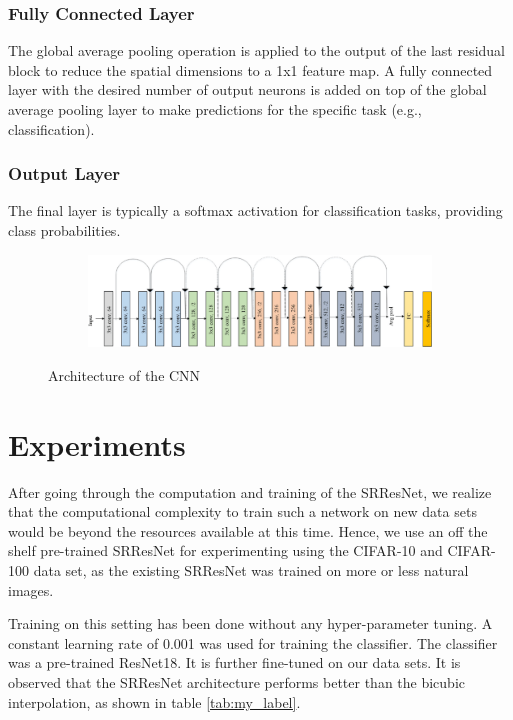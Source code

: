 \documentclass[10pt,twocolumn,letterpaper]{article}
\begin{document}
\subsubsection{Fully Connected Layer}
The global average pooling operation is applied to the output of the last residual block to reduce the spatial dimensions to a 1x1 feature map. A fully connected layer with the desired number of output neurons is added on top of the global average pooling layer to make predictions for the specific task (e.g., classification).

\subsubsection{Output Layer}
The final layer is typically a softmax activation for classification tasks, providing class probabilities.

\begin{figure}
    \centering
    \begin{subfigure}{0.5\textwidth}
        \includegraphics[width=\linewidth]{ResNet18 - 1.png}
    \end{subfigure}
    \caption{Architecture of the CNN}
    \label{fig:enter-label}
\end{figure}

\section{Experiments}
After going through the computation and training of the SRResNet, we realize that the computational complexity to train such a network on new data sets would be beyond the resources available at this time. Hence, we use an off the shelf pre-trained SRResNet for experimenting using the CIFAR-10 and CIFAR-100 data set, as the existing SRResNet was trained on more or less natural images.

Training on this setting has been done without any hyper-parameter tuning. A constant learning rate of 0.001 was used for training the classifier. The classifier was a pre-trained ResNet18. It is further fine-tuned on our data sets. It is observed that the SRResNet architecture performs better than the bicubic interpolation, as shown in table \ref{tab:my_label}.
\end{document}
